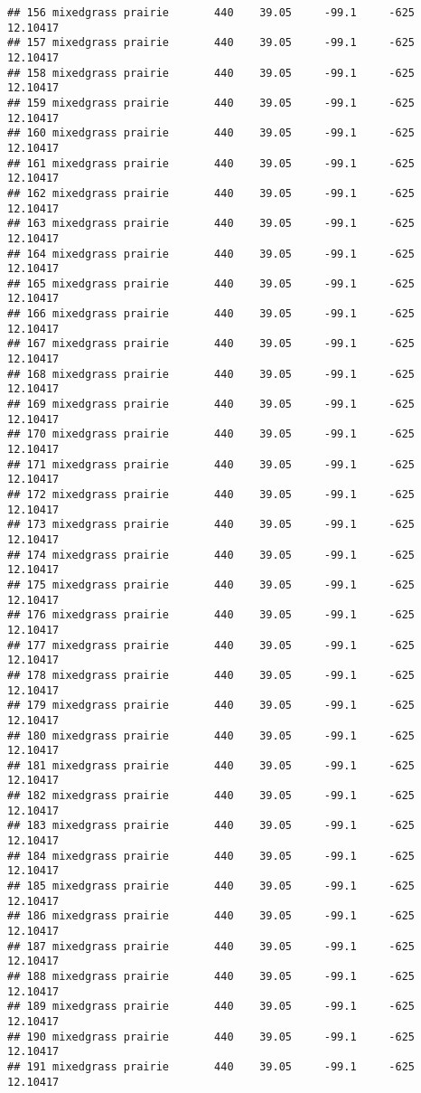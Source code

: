\documentclass[]{article}
\begin{document}
\begin{verbatim}
## 156 mixedgrass prairie       440    39.05     -99.1     -625 12.10417
## 157 mixedgrass prairie       440    39.05     -99.1     -625 12.10417
## 158 mixedgrass prairie       440    39.05     -99.1     -625 12.10417
## 159 mixedgrass prairie       440    39.05     -99.1     -625 12.10417
## 160 mixedgrass prairie       440    39.05     -99.1     -625 12.10417
## 161 mixedgrass prairie       440    39.05     -99.1     -625 12.10417
## 162 mixedgrass prairie       440    39.05     -99.1     -625 12.10417
## 163 mixedgrass prairie       440    39.05     -99.1     -625 12.10417
## 164 mixedgrass prairie       440    39.05     -99.1     -625 12.10417
## 165 mixedgrass prairie       440    39.05     -99.1     -625 12.10417
## 166 mixedgrass prairie       440    39.05     -99.1     -625 12.10417
## 167 mixedgrass prairie       440    39.05     -99.1     -625 12.10417
## 168 mixedgrass prairie       440    39.05     -99.1     -625 12.10417
## 169 mixedgrass prairie       440    39.05     -99.1     -625 12.10417
## 170 mixedgrass prairie       440    39.05     -99.1     -625 12.10417
## 171 mixedgrass prairie       440    39.05     -99.1     -625 12.10417
## 172 mixedgrass prairie       440    39.05     -99.1     -625 12.10417
## 173 mixedgrass prairie       440    39.05     -99.1     -625 12.10417
## 174 mixedgrass prairie       440    39.05     -99.1     -625 12.10417
## 175 mixedgrass prairie       440    39.05     -99.1     -625 12.10417
## 176 mixedgrass prairie       440    39.05     -99.1     -625 12.10417
## 177 mixedgrass prairie       440    39.05     -99.1     -625 12.10417
## 178 mixedgrass prairie       440    39.05     -99.1     -625 12.10417
## 179 mixedgrass prairie       440    39.05     -99.1     -625 12.10417
## 180 mixedgrass prairie       440    39.05     -99.1     -625 12.10417
## 181 mixedgrass prairie       440    39.05     -99.1     -625 12.10417
## 182 mixedgrass prairie       440    39.05     -99.1     -625 12.10417
## 183 mixedgrass prairie       440    39.05     -99.1     -625 12.10417
## 184 mixedgrass prairie       440    39.05     -99.1     -625 12.10417
## 185 mixedgrass prairie       440    39.05     -99.1     -625 12.10417
## 186 mixedgrass prairie       440    39.05     -99.1     -625 12.10417
## 187 mixedgrass prairie       440    39.05     -99.1     -625 12.10417
## 188 mixedgrass prairie       440    39.05     -99.1     -625 12.10417
## 189 mixedgrass prairie       440    39.05     -99.1     -625 12.10417
## 190 mixedgrass prairie       440    39.05     -99.1     -625 12.10417
## 191 mixedgrass prairie       440    39.05     -99.1     -625 12.10417

\end{verbatim}
\end{document}
